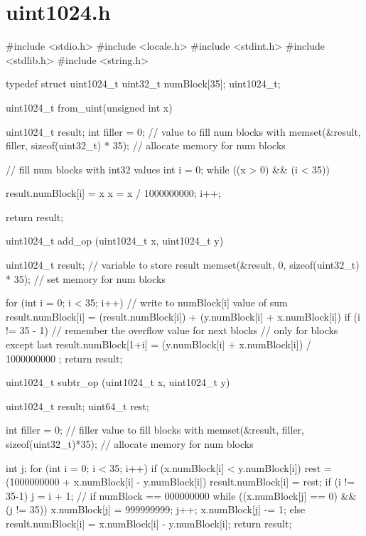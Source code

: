 \documentclass[a4paper,14pt]{article}
\begin{document}
\newpage
\section{uint1024.h}
\begin{python}
#include <stdio.h>
#include <locale.h>
#include <stdint.h>
#include <stdlib.h>
#include <string.h>

typedef struct uint1024_t
{
    uint32_t numBlock[35];
} uint1024_t;

uint1024_t from_uint(unsigned int x)
{
    uint1024_t result;
    int filler = 0; // value to fill num blocks with
    memset(&result, filler, sizeof(uint32_t) * 35); // allocate memory for num blocks

    // fill num blocks with int32 values
    int i = 0;
    while ((x > 0) && (i < 35))
    {
        result.numBlock[i] = x %
        x = x / 1000000000; i++;

    }
    return result;
}

uint1024_t add_op (uint1024_t x, uint1024_t y)
{
    uint1024_t result; // variable to store result
    memset(&result, 0, sizeof(uint32_t) * 35); // set memory for num blocks

    for (int i = 0; i < 35; i++)
    {   // write to numBlock[i] value of sum
        result.numBlock[i] = (result.numBlock[i]) + (y.numBlock[i] + x.numBlock[i]) %
        if (i != 35 - 1) // remember the overflow value for next blocks
        { // only for blocks except last
            result.numBlock[1+i] = (y.numBlock[i] + x.numBlock[i]) / 1000000000 ;
        }
    }
    return result;
}

uint1024_t subtr_op (uint1024_t x, uint1024_t y)
{
    uint1024_t result;
    uint64_t rest;

    int filler = 0; // filler value to fill blocks with
    memset(&result, filler, sizeof(uint32_t)*35); // allocate memory for num blocks

    int j;
    for (int i = 0; i < 35; i++)
    {
        if (x.numBlock[i] < y.numBlock[i])
        {
            rest = (1000000000 + x.numBlock[i] - y.numBlock[i]) %
            result.numBlock[i] = rest;
            if (i != 35-1)
            {
                j = i + 1;
                // if numBlock == 000000000
                while ((x.numBlock[j] == 0) && (j != 35))
                {
                    x.numBlock[j] = 999999999;
                    j++;
                }
                x.numBlock[j] -= 1;
            }
        }
        else
        {result.numBlock[i] = x.numBlock[i] - y.numBlock[i];}
    }
    return result;
}


\end{python}
\end{document}
